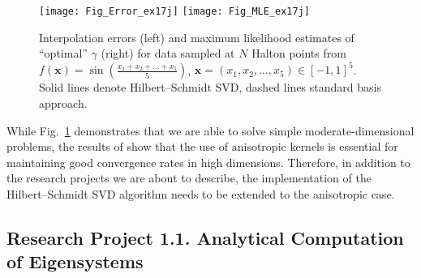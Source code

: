 \documentclass[11pt]{NSFamsart}
\newcommand{\bx}{{\boldsymbol{x}}}
\begin{document}
\begin{figure}[h]
    \centering
    \texttt{[image: Fig\_Error\_ex17j]}
    \texttt{[image: Fig\_MLE\_ex17j]}
\caption{Interpolation errors (left) and maximum likelihood estimates of ``optimal'' $\gamma$ (right) for data sampled at $N$ Halton points from $f(\bx) = \sin\left(\tfrac{x_1+x_2+\ldots+x_5}{5}\right)$, $\bx=(x_1,x_2,\ldots,x_5) \in [-1,1]^5$. Solid lines denote Hilbert--Schmidt SVD, dashed lines standard basis approach.}\label{Fig_HSSVD}
\end{figure}

While Fig.~\ref{Fig_HSSVD} demonstrates that we are able to solve simple moderate-dimensional problems, the results of \cite{FasHicWoz12b, FasHicWoz12a} show that the use of anisotropic kernels is essential for maintaining good convergence rates in high dimensions. Therefore, in addition to the research projects we are about to describe, the implementation of the Hilbert--Schmidt SVD algorithm needs to be extended to the anisotropic case.

\subsection*{Research Project 1.1. Analytical Computation of Eigensystems} \label{AnalyticEigensubsec}
\end{document}
